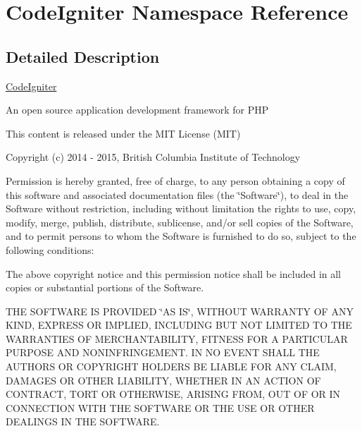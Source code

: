 \hypertarget{namespace_code_igniter}{}\section{Code\+Igniter Namespace Reference}
\label{namespace_code_igniter}


\subsection{Detailed Description}
\hyperlink{namespace_code_igniter}{Code\+Igniter}

An open source application development framework for P\+H\+P

This content is released under the M\+I\+T License (M\+I\+T)

Copyright (c) 2014 -\/ 2015, British Columbia Institute of Technology

Permission is hereby granted, free of charge, to any person obtaining a copy of this software and associated documentation files (the \char`\"{}\+Software\char`\"{}), to deal in the Software without restriction, including without limitation the rights to use, copy, modify, merge, publish, distribute, sublicense, and/or sell copies of the Software, and to permit persons to whom the Software is furnished to do so, subject to the following conditions\+:

The above copyright notice and this permission notice shall be included in all copies or substantial portions of the Software.

T\+H\+E S\+O\+F\+T\+W\+A\+R\+E I\+S P\+R\+O\+V\+I\+D\+E\+D \char`\"{}\+A\+S I\+S\char`\"{}, W\+I\+T\+H\+O\+U\+T W\+A\+R\+R\+A\+N\+T\+Y O\+F A\+N\+Y K\+I\+N\+D, E\+X\+P\+R\+E\+S\+S O\+R I\+M\+P\+L\+I\+E\+D, I\+N\+C\+L\+U\+D\+I\+N\+G B\+U\+T N\+O\+T L\+I\+M\+I\+T\+E\+D T\+O T\+H\+E W\+A\+R\+R\+A\+N\+T\+I\+E\+S O\+F M\+E\+R\+C\+H\+A\+N\+T\+A\+B\+I\+L\+I\+T\+Y, F\+I\+T\+N\+E\+S\+S F\+O\+R A P\+A\+R\+T\+I\+C\+U\+L\+A\+R P\+U\+R\+P\+O\+S\+E A\+N\+D N\+O\+N\+I\+N\+F\+R\+I\+N\+G\+E\+M\+E\+N\+T. I\+N N\+O E\+V\+E\+N\+T S\+H\+A\+L\+L T\+H\+E A\+U\+T\+H\+O\+R\+S O\+R C\+O\+P\+Y\+R\+I\+G\+H\+T H\+O\+L\+D\+E\+R\+S B\+E L\+I\+A\+B\+L\+E F\+O\+R A\+N\+Y C\+L\+A\+I\+M, D\+A\+M\+A\+G\+E\+S O\+R O\+T\+H\+E\+R L\+I\+A\+B\+I\+L\+I\+T\+Y, W\+H\+E\+T\+H\+E\+R I\+N A\+N A\+C\+T\+I\+O\+N O\+F C\+O\+N\+T\+R\+A\+C\+T, T\+O\+R\+T O\+R O\+T\+H\+E\+R\+W\+I\+S\+E, A\+R\+I\+S\+I\+N\+G F\+R\+O\+M, O\+U\+T O\+F O\+R I\+N C\+O\+N\+N\+E\+C\+T\+I\+O\+N W\+I\+T\+H T\+H\+E S\+O\+F\+T\+W\+A\+R\+E O\+R T\+H\+E U\+S\+E O\+R O\+T\+H\+E\+R D\+E\+A\+L\+I\+N\+G\+S I\+N T\+H\+E S\+O\+F\+T\+W\+A\+R\+E.

